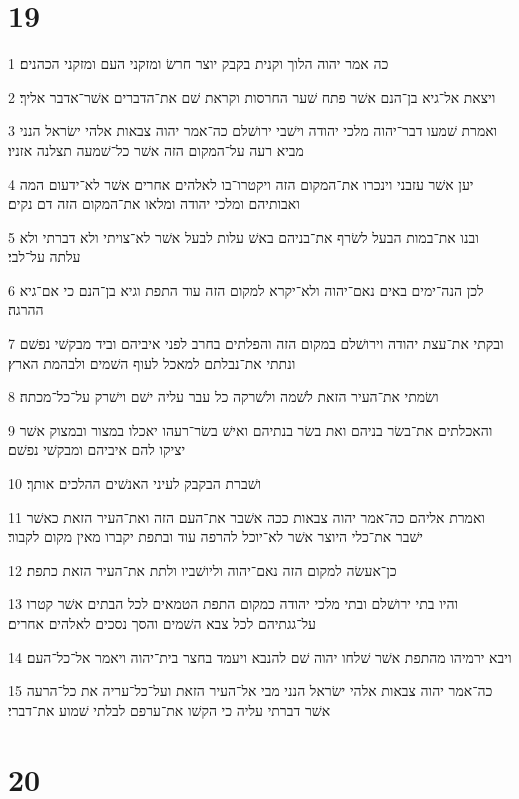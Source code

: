 \chapter{19}

\par 1 כה אמר יהוה הלוך וקנית בקבק יוצר חרשׂ ומזקני העם ומזקני הכהנים׃
\par 2 ויצאת אל־גיא בן־הנם אשׁר פתח שׁער החרסות וקראת שׁם את־הדברים אשׁר־אדבר אליך׃
\par 3 ואמרת שׁמעו דבר־יהוה מלכי יהודה וישׁבי ירושׁלם כה־אמר יהוה צבאות אלהי ישׂראל הנני מביא רעה על־המקום הזה אשׁר כל־שׁמעה תצלנה אזניו׃
\par 4 יען אשׁר עזבני וינכרו את־המקום הזה ויקטרו־בו לאלהים אחרים אשׁר לא־ידעום המה ואבותיהם ומלכי יהודה ומלאו את־המקום הזה דם נקים׃
\par 5 ובנו את־במות הבעל לשׂרף את־בניהם באשׁ עלות לבעל אשׁר לא־צויתי ולא דברתי ולא עלתה על־לבי׃
\par 6 לכן הנה־ימים באים נאם־יהוה ולא־יקרא למקום הזה עוד התפת וגיא בן־הנם כי אם־גיא ההרגה׃
\par 7 ובקתי את־עצת יהודה וירושׁלם במקום הזה והפלתים בחרב לפני איביהם וביד מבקשׁי נפשׁם ונתתי את־נבלתם למאכל לעוף השׁמים ולבהמת הארץ׃
\par 8 ושׂמתי את־העיר הזאת לשׁמה ולשׁרקה כל עבר עליה ישׁם וישׁרק על־כל־מכתה׃
\par 9 והאכלתים את־בשׂר בניהם ואת בשׂר בנתיהם ואישׁ בשׂר־רעהו יאכלו במצור ובמצוק אשׁר יציקו להם איביהם ומבקשׁי נפשׁם׃
\par 10 ושׁברת הבקבק לעיני האנשׁים ההלכים אותך׃
\par 11 ואמרת אליהם כה־אמר יהוה צבאות ככה אשׁבר את־העם הזה ואת־העיר הזאת כאשׁר ישׁבר את־כלי היוצר אשׁר לא־יוכל להרפה עוד ובתפת יקברו מאין מקום לקבור׃
\par 12 כן־אעשׂה למקום הזה נאם־יהוה וליושׁביו ולתת את־העיר הזאת כתפת׃
\par 13 והיו בתי ירושׁלם ובתי מלכי יהודה כמקום התפת הטמאים לכל הבתים אשׁר קטרו על־גגתיהם לכל צבא השׁמים והסך נסכים לאלהים אחרים׃
\par 14 ויבא ירמיהו מהתפת אשׁר שׁלחו יהוה שׁם להנבא ויעמד בחצר בית־יהוה ויאמר אל־כל־העם׃
\par 15 כה־אמר יהוה צבאות אלהי ישׂראל הנני מבי אל־העיר הזאת ועל־כל־עריה את כל־הרעה אשׁר דברתי עליה כי הקשׁו את־ערפם לבלתי שׁמוע את־דברי׃

\chapter{20}

